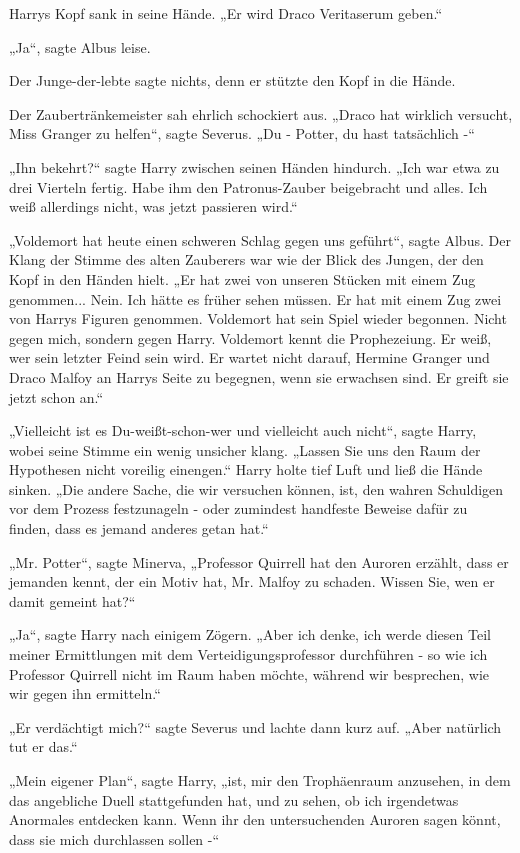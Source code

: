 {Harrys Kopf sank in seine Hände. „Er wird Draco Veritaserum geben.“

„Ja“, sagte Albus leise.

Der Junge-der-lebte sagte nichts, denn er stützte den Kopf in die Hände.

Der Zaubertränkemeister sah ehrlich schockiert aus. „Draco hat wirklich versucht, Miss Granger zu helfen“, sagte Severus. „Du - Potter, du hast tatsächlich -“

„Ihn bekehrt?“ sagte Harry zwischen seinen Händen hindurch. „Ich war etwa zu drei Vierteln fertig. Habe ihm den Patronus-Zauber beigebracht und alles. Ich weiß allerdings nicht, was jetzt passieren wird.“

„Voldemort hat heute einen schweren Schlag gegen uns geführt“, sagte Albus. Der Klang der Stimme des alten Zauberers war wie der Blick des Jungen, der den Kopf in den Händen hielt. „Er hat zwei von unseren Stücken mit einem Zug genommen... Nein. Ich hätte es früher sehen müssen. Er hat mit einem Zug zwei von Harrys Figuren genommen. Voldemort hat sein Spiel wieder begonnen. Nicht gegen mich, sondern gegen Harry. Voldemort kennt die Prophezeiung. Er weiß, wer sein letzter Feind sein wird. Er wartet nicht darauf, Hermine Granger und Draco Malfoy an Harrys Seite zu begegnen, wenn sie erwachsen sind. Er greift sie jetzt schon an.“

„Vielleicht ist es Du-weißt-schon-wer und vielleicht auch nicht“, sagte Harry, wobei seine Stimme ein wenig unsicher klang. „Lassen Sie uns den Raum der Hypothesen nicht voreilig einengen.“ Harry holte tief Luft und ließ die Hände sinken. „Die andere Sache, die wir versuchen können, ist, den wahren Schuldigen vor dem Prozess festzunageln - oder zumindest handfeste Beweise dafür zu finden, dass es jemand anderes getan hat.“

„Mr. Potter“, sagte Minerva, „Professor Quirrell hat den Auroren erzählt, dass er jemanden kennt, der ein Motiv hat, Mr. Malfoy zu schaden. Wissen Sie, wen er damit gemeint hat?“

„Ja“, sagte Harry nach einigem Zögern. „Aber ich denke, ich werde diesen Teil meiner Ermittlungen mit dem Verteidigungsprofessor durchführen - so wie ich Professor Quirrell nicht im Raum haben möchte, während wir besprechen, wie wir gegen ihn ermitteln.“

„Er verdächtigt mich?“ sagte Severus und lachte dann kurz auf. „Aber natürlich tut er das.“

„Mein eigener Plan“, sagte Harry, „ist, mir den Trophäenraum anzusehen, in dem das angebliche Duell stattgefunden hat, und zu sehen, ob ich irgendetwas Anormales entdecken kann. Wenn ihr den untersuchenden Auroren sagen könnt, dass sie mich durchlassen sollen -“

}
